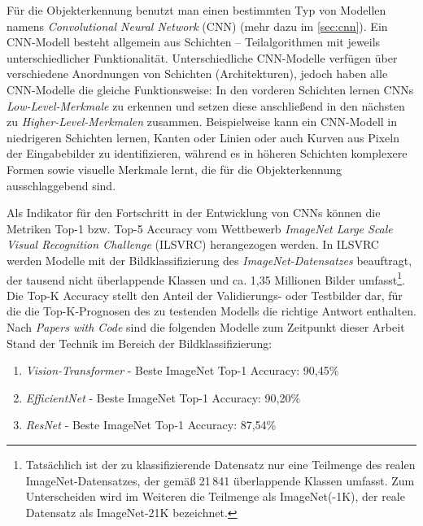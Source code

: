 Für die Objekterkennung benutzt man einen bestimmten Typ von Modellen namens \emph{Convolutional Neural Network} (CNN) (mehr dazu im \autoref{sec:cnn}). Ein CNN-Modell besteht allgemein aus Schichten – Teilalgorithmen mit jeweils unterschiedlicher Funktionalität. Unterschiedliche CNN-Modelle verfügen über verschiedene Anordnungen von Schichten (Architekturen), jedoch haben alle CNN-Modelle die gleiche Funktionsweise: In den vorderen Schichten lernen CNNs \emph{Low-Level-Merkmale} zu erkennen und setzen diese anschließend in den nächsten zu \emph{Higher-Level-Merkmalen} zusammen. Beispielweise kann ein CNN-Modell in niedrigeren Schichten lernen, Kanten oder Linien oder auch Kurven aus Pixeln der Eingabebilder zu identifizieren, während es in höheren Schichten komplexere Formen sowie visuelle Merkmale lernt, die für die Objekterkennung ausschlaggebend sind.

Als Indikator für den Fortschritt in der Entwicklung von CNNs können die Metriken Top-1 bzw. Top-5 Accuracy vom Wettbewerb \emph{ImageNet Large Scale Visual Recognition Challenge} (ILSVRC) \cite{russakovsky2015imagenet} herangezogen werden. In ILSVRC werden Modelle mit der Bildklassifizierung des \emph{ImageNet-Datensatzes} beauftragt, der tausend nicht überlappende Klassen und ca. 1,35 Millionen Bilder umfasst\footnote{Tatsächlich ist der zu klassifizierende Datensatz nur eine Teilmenge des realen ImageNet-Datensatzes, der gemäß \cite{ridnik2021imagenet21k} 21\,841 überlappende Klassen umfasst. Zum Unterscheiden wird im Weiteren die Teilmenge als ImageNet(-1K), der reale Datensatz als ImageNet-21K bezeichnet.}. Die Top-K Accuracy stellt den Anteil der Validierungs- oder Testbilder dar, für die die Top-K-Prognosen des zu testenden Modells die richtige Antwort enthalten. Nach \emph{Papers with Code} \cite{PapersWithCode-ImageNet} sind die folgenden Modelle zum Zeitpunkt dieser Arbeit Stand der Technik im Bereich der Bildklassifizierung:

\begin{enumerate}
	\item \emph{Vision-Transformer} \cite{dosovitskiy2021image} - Beste ImageNet Top-1 Accuracy: 90,45\%  \cite{zhai2021scaling}
	\item \emph{EfficientNet} \cite{tan2020efficientnet} - Beste ImageNet Top-1 Accuracy: 90,20\%  \cite{pham2021meta}
	\item \emph{ResNet} \cite{he2015deep} - Beste ImageNet Top-1 Accuracy: 87,54\% \cite{kolesnikov2020big}
\end{enumerate}

